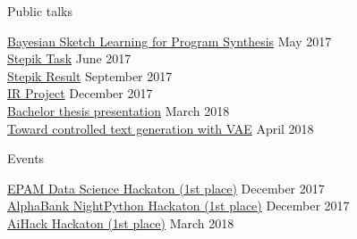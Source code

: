 \documentclass{resume} %
\newcommand{\SKIP}{\vspace{-1.85\baselineskip}}
\begin{document}
\begin{rSection}{Public talks}

{\href{https://docs.google.com/presentation/d/1ieE0JZWKbCQH_qpH81M1pSbUSARBP7DKLdGVwk563pM/pub?start=false&loop=false&delayms=3000}{Bayesian Sketch Learning for Program Synthesis}} \hfill May 2017 \\ 
{\href{https://docs.google.com/presentation/d/19FyHBksjffXY6nF1B1xRvkkW-lSp0QIPzU_o-h5RD00/pub?start=false&loop=false&delayms=3000}{Stepik Task}} \hfill June 2017 \\
{\href{https://docs.google.com/presentation/d/e/2PACX-1vSooVyWYFG1swzqGyjLB7dYQ9sLMzzg_s-GqHXBTOw21FyBzhWBtI73wAZlr5lATY5iqEstFBe--Opc/pub?start=false&loop=false&delayms=3000}{Stepik Result}} \hfill September 2017 \\
{\href{https://docs.google.com/presentation/d/e/2PACX-1vT5Qs8ly5csvfrqpafVQ4H0pQTr0U1S1XYF1gudEBVSxXaMwgUgVN4zEBDhO11j3d2Td7VmJ_PK6VGJ/pub?start=false&loop=false&delayms=3000}{IR Project}} \hfill December 2017 \\
{\href{https://github.com/stasbel/bachelor-thesis/blob/master/presentation.pdf}{Bachelor thesis presentation}} \hfill March 2018 \\
{\href{https://docs.google.com/presentation/d/e/2PACX-1vQ6CIjNIHKuT5guAizP6h3ko0_jHKFIND6aRMWNDYZLKochDeXqDeAjsoDYtTN6LBY6o1lcKZci503j/pub?start=false&loop=false&delayms=3000}{Toward controlled text generation with VAE}} \hfill April 2018 \\

\end{rSection} 
\SKIP
\begin{rSection}{Events}

\href{https://events.epam.com/events/data-science-hackathon}{EPAM Data Science Hackaton (1st place)} \hfill December 2017 \\
\href{http://1.changellenge.com/nightpython}{AlphaBank NightPython Hackaton (1st place)} \hfill December 2017 \\
\href{http://aihack.ai-hub.ru/}{AiHack Hackaton (1st place)} \hfill March 2018 \\

\end{rSection} 
\SKIP
\end{document}

